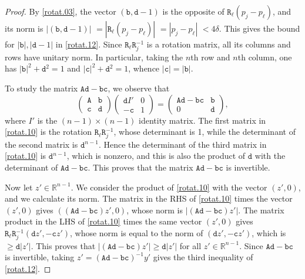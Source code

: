 \documentclass[10pt,reqno,a4paper]{article}
\numberwithin{equation}{section}
\theoremstyle{plain}
\theoremstyle{definition}
\newcommand{\R}{{\mathbb R}}
\begin{document}
\begin{proof}
By \eqref{rotat.03}, the vector $(\mathtt b, \mathtt d - 1)$ 
is the opposite of $\mathtt R_\ell (p_j - p_\ell)$, 
and its norm is $|(\mathtt b, \mathtt d - 1)|$ 
$= |\mathtt R_\ell (p_j - p_\ell)|$ 
$ = |p_j - p_\ell|$ 
$< 4 \delta$.
This gives the bound for $|\mathtt b|, |\mathtt d - 1|$ in \eqref{rotat.12}.
Since $\mathtt R_\ell \mathtt R_j^{-1}$ is a rotation matrix, 
all its columns and rows have unitary norm. 
In particular, taking the $n$th row and $n$th column, one has 
$|\mathtt b|^2 + \mathtt d^2 = 1$ and 
$|\mathtt c|^2 + \mathtt d^2 = 1$, 
whence $|\mathtt c| = |\mathtt b|$. 

To study the matrix $\mathtt A \mathtt d - \mathtt b \mathtt c$,  
we observe that 
\begin{equation} \label{rotat.10}
\begin{pmatrix} \mathtt A & \mathtt b \\ \mathtt c & \mathtt d \end{pmatrix}
\begin{pmatrix} \mathtt d I' & 0 \\ - \mathtt c & 1 \end{pmatrix}
= 
\begin{pmatrix} \mathtt A \mathtt d - \mathtt b \mathtt c & \mathtt b \\ 0 & \mathtt d \end{pmatrix}\!,
\end{equation}
where $I'$ is the $(n-1) \times (n-1)$ identity matrix. 
The first matrix in \eqref{rotat.10} is the rotation $\mathtt R_\ell \mathtt R_j^{-1}$, 
whose determinant is 1, while the determinant of the second matrix is $\mathtt d^{n-1}$.  
Hence the determinant of the third matrix in \eqref{rotat.10} is $\mathtt d^{n-1}$, which is nonzero,  
and this is also the product of $\mathtt d$ with the determinant 
of $\mathtt A \mathtt d - \mathtt b \mathtt c$. 
This proves that the matrix $\mathtt A \mathtt d - \mathtt b \mathtt c$ is invertible. 

Now let $z' \in \R^{n-1}$. 
We consider the product of \eqref{rotat.10} with the vector $(z',0)$,  
and we calculate its norm. 
The matrix in the RHS of \eqref{rotat.10} 
times the vector $(z',0)$ gives $((\mathtt A \mathtt d - \mathtt b \mathtt c)z', 0)$,   
whose norm is $|(\mathtt A \mathtt d - \mathtt b \mathtt c)z'|$.  
The matrix product in the LHS of \eqref{rotat.10} 
times the same vector $(z',0)$ gives 
$\mathtt R_\ell \mathtt R_j^{-1} (\mathtt d z', - \mathtt c z')$, 
whose norm is equal to the norm of $(\mathtt d z', - \mathtt c z')$,
which is $\geq \mathtt d |z'|$. 
This proves that $|(\mathtt A \mathtt d - \mathtt b \mathtt c)z'| \geq \mathtt d |z'|$ 
for all $z' \in \R^{n-1}$. 
Since $\mathtt A \mathtt d - \mathtt b \mathtt c$ is invertible, 
taking $z' = (\mathtt A \mathtt d - \mathtt b \mathtt c)^{-1} y'$ gives 
the third inequality of \eqref{rotat.12}. 


\end{proof}
\end{document}
